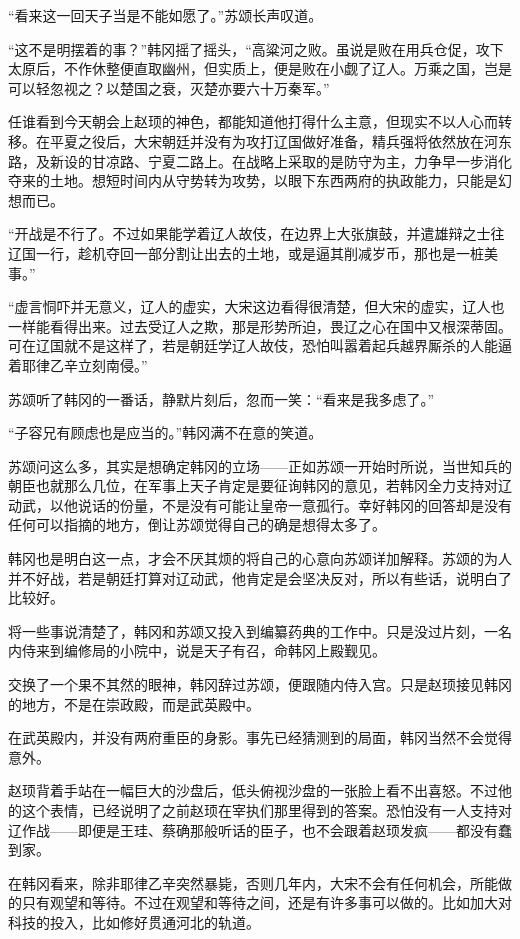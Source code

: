 “看来这一回天子当是不能如愿了。”苏颂长声叹道。

“这不是明摆着的事？”韩冈摇了摇头，“高粱河之败。虽说是败在用兵仓促，攻下太原后，不作休整便直取幽州，但实质上，便是败在小觑了辽人。万乘之国，岂是可以轻忽视之？以楚国之衰，灭楚亦要六十万秦军。”

任谁看到今天朝会上赵顼的神色，都能知道他打得什么主意，但现实不以人心而转移。在平夏之役后，大宋朝廷并没有为攻打辽国做好准备，精兵强将依然放在河东路，及新设的甘凉路、宁夏二路上。在战略上采取的是防守为主，力争早一步消化夺来的土地。想短时间内从守势转为攻势，以眼下东西两府的执政能力，只能是幻想而已。

“开战是不行了。不过如果能学着辽人故伎，在边界上大张旗鼓，并遣雄辩之士往辽国一行，趁机夺回一部分割让出去的土地，或是逼其削减岁币，那也是一桩美事。”

“虚言恫吓并无意义，辽人的虚实，大宋这边看得很清楚，但大宋的虚实，辽人也一样能看得出来。过去受辽人之欺，那是形势所迫，畏辽之心在国中又根深蒂固。可在辽国就不是这样了，若是朝廷学辽人故伎，恐怕叫嚣着起兵越界厮杀的人能逼着耶律乙辛立刻南侵。”

苏颂听了韩冈的一番话，静默片刻后，忽而一笑：“看来是我多虑了。”

“子容兄有顾虑也是应当的。”韩冈满不在意的笑道。

苏颂问这么多，其实是想确定韩冈的立场——正如苏颂一开始时所说，当世知兵的朝臣也就那么几位，在军事上天子肯定是要征询韩冈的意见，若韩冈全力支持对辽动武，以他说话的份量，不是没有可能让皇帝一意孤行。幸好韩冈的回答却是没有任何可以指摘的地方，倒让苏颂觉得自己的确是想得太多了。

韩冈也是明白这一点，才会不厌其烦的将自己的心意向苏颂详加解释。苏颂的为人并不好战，若是朝廷打算对辽动武，他肯定是会坚决反对，所以有些话，说明白了比较好。

将一些事说清楚了，韩冈和苏颂又投入到编纂药典的工作中。只是没过片刻，一名内侍来到编修局的小院中，说是天子有召，命韩冈上殿觐见。

交换了一个果不其然的眼神，韩冈辞过苏颂，便跟随内侍入宫。只是赵顼接见韩冈的地方，不是在崇政殿，而是武英殿中。

在武英殿内，并没有两府重臣的身影。事先已经猜测到的局面，韩冈当然不会觉得意外。

赵顼背着手站在一幅巨大的沙盘后，低头俯视沙盘的一张脸上看不出喜怒。不过他的这个表情，已经说明了之前赵顼在宰执们那里得到的答案。恐怕没有一人支持对辽作战——即便是王珪、蔡确那般听话的臣子，也不会跟着赵顼发疯——都没有蠢到家。

在韩冈看来，除非耶律乙辛突然暴毙，否则几年内，大宋不会有任何机会，所能做的只有观望和等待。不过在观望和等待之间，还是有许多事可以做的。比如加大对科技的投入，比如修好贯通河北的轨道。

